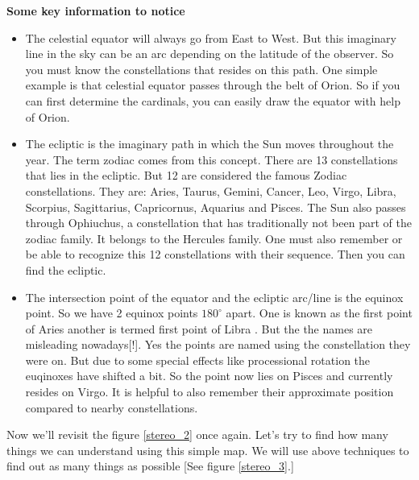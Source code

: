 \documentclass[a4paper,12pt]{extarticle}
\begin{document}
\textbf{Some key information to notice}
\begin{itemize}
	\itemsep0em 
    \item The celestial equator will always go from East to West. But this imaginary line in the sky can be an arc depending on the latitude of the observer. So you must know the constellations that resides on this path. One simple example is that celestial equator passes through the belt of Orion. So if you can first determine the cardinals, you can easily draw the equator with help of Orion.
    \item The ecliptic is the imaginary path in which the Sun moves throughout the year. The term zodiac comes from this concept. There are 13 constellations that lies in the ecliptic. But 12 are considered the famous Zodiac constellations. They are: Aries, Taurus, Gemini, Cancer, Leo, Virgo, Libra, Scorpius, Sagittarius, Capricornus, Aquarius and Pisces. The Sun also passes through Ophiuchus, a constellation that has traditionally not been part of the zodiac family. It belongs to the Hercules family. One must also remember or be able to recognize this 12 constellations with their sequence. Then you can find the ecliptic.
    \item The intersection point of the equator and the ecliptic arc/line is the equinox point. So we have 2 equinox points $180^\circ$ apart. One is known as the first point of Aries \aries \; another is termed first point of Libra \libra. But the the names are misleading nowadays[!]. Yes the points are named using the constellation they were on. But due to some special effects like processional rotation the euqinoxes have shifted a bit. So the \aries \; point now lies on Pisces and \libra \; currently resides on Virgo. It is helpful to also remember their approximate position compared to nearby constellations.
\end{itemize}

Now we'll revisit the figure \ref{stereo_2} once again. Let's try to find how many things we can understand using this simple map. We will use above techniques to find out as many things as possible [See figure \ref{stereo_3}.]
\end{document}
